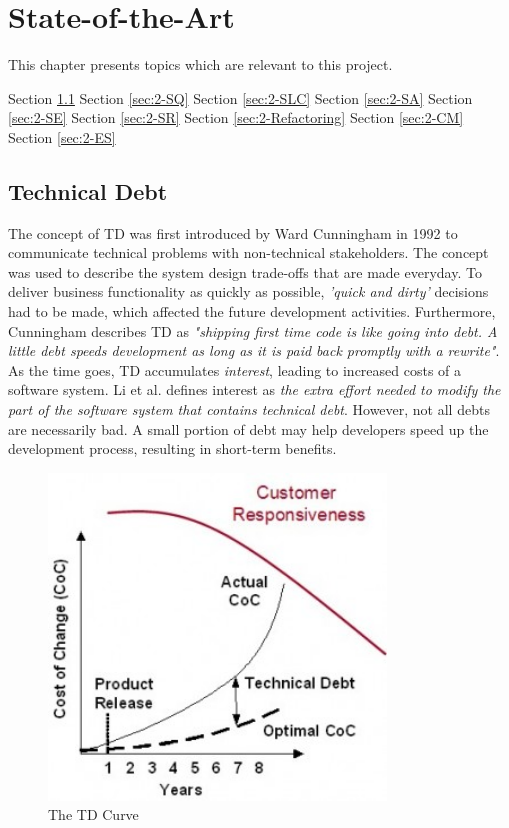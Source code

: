 \chapter{State-of-the-Art}
This chapter presents topics which are relevant to this project. 

Section \ref{sec:2-TD}
Section \ref{sec:2-SQ}
Section \ref{sec:2-SLC}
Section \ref{sec:2-SA}
Section \ref{sec:2-SE}
Section \ref{sec:2-SR}
Section \ref{sec:2-Refactoring}
Section \ref{sec:2-CM}
Section \ref{sec:2-ES}


\section{Technical Debt}
\label{sec:2-TD}
The concept of TD was first introduced by Ward Cunningham in 1992 to communicate technical problems with non-technical stakeholders\cite{p29-cunningham}. The concept was used to describe the system design trade-offs that are made everyday. To deliver business functionality as quickly as possible, \textit{'quick and dirty'} decisions had to be made, which affected the future development activities. Furthermore, Cunningham describes TD as \textit{"shipping first time code is like going into debt. A little debt speeds development as long as it is paid back promptly with a rewrite"}. As the time goes, TD accumulates \textit{interest}, leading to increased costs of a software system\cite{p31-guo,p35-klinger}. Li et al.\cite{li2015systematic} defines interest as \textit{the extra effort needed to modify the part of the software system that contains technical debt}. However, not all debts are necessarily bad. A small portion of debt may help developers speed up the development process, resulting in short-term benefits\cite{p31-guo}. 

\begin{figure}[ht!]
	\centering
	\includegraphics[width=0.8\textwidth]{images/techdebtCurve.jpg}
	\caption{The TD Curve\cite{jim-highsmith}}
	\label{fig:techDebtCurve}
\end{figure}

